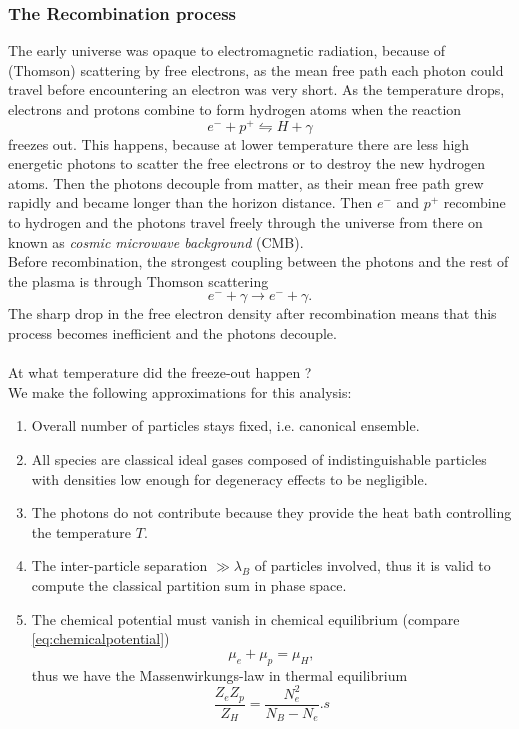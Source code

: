 \subsubsection{The Recombination process}
The early universe was opaque to electromagnetic radiation, because of (Thomson) scattering by free electrons, as the mean free path each photon could travel before encountering an electron was very short. As the temperature drops, electrons and protons combine to form hydrogen atoms when the reaction
\begin{equation}
e^- + p^+ \leftrightharpoons H + \gamma 
\end{equation}
freezes out. This happens, because at lower temperature there are less high energetic photons to scatter the free electrons or to destroy the new hydrogen atoms. Then the photons decouple from matter, as their mean free path grew rapidly and became longer than the horizon distance. Then $e^-$ and $p^+$ recombine to hydrogen and the photons travel freely through the universe from there on known as \emph{cosmic microwave background} (CMB).\\
Before recombination, the strongest coupling between the photons and the rest of the plasma is through Thomson scattering
\begin{equation}
e^- + \gamma \rightarrow e^- + \gamma.
\end{equation}
The sharp drop in the free electron density after recombination means that this process becomes inefficient and the photons decouple.\\
\\
At what temperature did the freeze-out happen ?\\
We make the following approximations for this analysis:
\begin{enumerate}
	\item Overall number of particles stays fixed, i.e. canonical ensemble.
	\item All species are classical ideal gases composed of indistinguishable particles with densities low enough for degeneracy effects to be negligible.
	\item The photons do not contribute because they provide the heat bath controlling the temperature $T$.
	\item The inter-particle separation $\gg \lambda_B$ of particles involved, thus it is valid to compute the classical partition sum in phase space.
	\item The chemical potential must vanish in chemical equilibrium (compare \ref{eq:chemicalpotential})
	\begin{equation}
		\mu_e + \mu_p =  \mu_H,
	\end{equation}
	thus we have the Massenwirkungs-law in thermal equilibrium
	\begin{equation}
		\frac{Z_e Z_p}{Z_H} = \frac{N^2_e}{N_B - N_e}.s
	\end{equation}
\end{enumerate}
